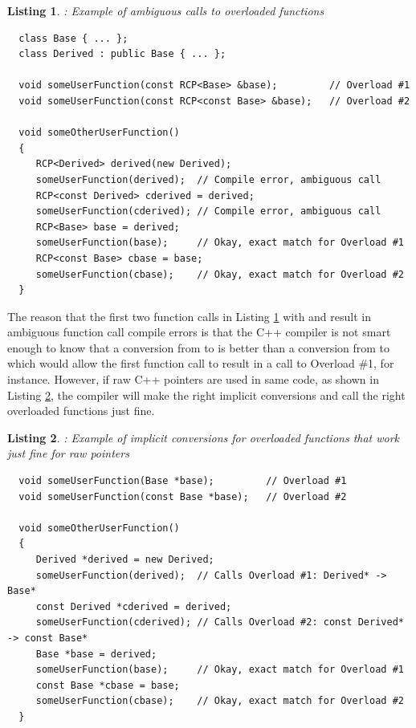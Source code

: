 \documentclass[pdf,ps2pdf,11pt]{SANDreport}
\newtheorem{listing}{Listing}
\begin{document}
{}\begin{listing}: Example of ambiguous calls to overloaded functions
\label{listing:overloaded-func-implicit-conv-problem}
{\small\begin{verbatim}
  class Base { ... };
  class Derived : public Base { ... };

  void someUserFunction(const RCP<Base> &base);         // Overload #1
  void someUserFunction(const RCP<const Base> &base);   // Overload #2

  void someOtherUserFunction()
  {
     RCP<Derived> derived(new Derived);
     someUserFunction(derived);  // Compile error, ambiguous call
     RCP<const Derived> cderived = derived;
     someUserFunction(cderived); // Compile error, ambiguous call
     RCP<Base> base = derived;
     someUserFunction(base);     // Okay, exact match for Overload #1
     RCP<const Base> cbase = base;
     someUserFunction(cbase);    // Okay, exact match for Overload #2
  }
\end{verbatim}}
\end{listing}


The reason that the first two function calls in Listing
{}\ref{listing:overloaded-func-implicit-conv-problem} with
{} and {} result in
ambiguous function call compile errors is that the C++ compiler is not
smart enough to know that a conversion from {} to
{} is better than a conversion from
{} to {} which would allow the
first function call to result in a call to Overload \#1, for instance.
However, if raw C++ pointers are used in same code, as shown in
Listing {}\ref{listing:overloaded-func-implicit-conv-raw-pass}, the
compiler will make the right implicit conversions and call the right
overloaded functions just fine.


{}\begin{listing}: Example of implicit conversions for overloaded
functions that work just fine for raw pointers
\label{listing:overloaded-func-implicit-conv-raw-pass}
{\small\begin{verbatim}
  void someUserFunction(Base *base);         // Overload #1
  void someUserFunction(const Base *base);   // Overload #2

  void someOtherUserFunction()
  {
     Derived *derived = new Derived;
     someUserFunction(derived);  // Calls Overload #1: Derived* -> Base*
     const Derived *cderived = derived;
     someUserFunction(cderived); // Calls Overload #2: const Derived* -> const Base*
     Base *base = derived;
     someUserFunction(base);     // Okay, exact match for Overload #1
     const Base *cbase = base;
     someUserFunction(cbase);    // Okay, exact match for Overload #2
  }
\end{verbatim}}
\end{listing}
\end{document}
